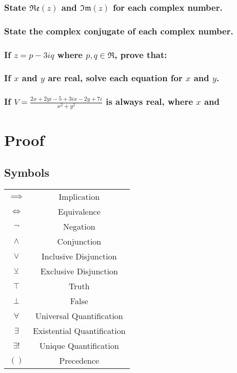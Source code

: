 \documentclass{report}
\newcommand{\re}[1]{\mathfrak{Re}(#1)}
\newcommand{\im}[1]{\mathfrak{Im}(#1)}
\newcommand{\uexists}{\exists !}
\newcommand{\realnumbers}{\mathfrak{R}}
\newcommand{\veebar}{\underbar{$\vee$}}
\begin{document}
            \subsection{State $\re{z}$ and $\im{z}$ for each complex number.}
            \subsection{State the complex conjugate of each complex number.}
            \subsection{If $z=p-3iq$ where $p,q\in\realnumbers$, prove that:}
            \subsection{If $x$ and $y$ are real, solve each equation for $x$ and $y$.}
            \subsection{If $V=\frac{2x+2yi-5+3ix-2y+7i}{x^2+y^2}$ is always real, where $x$ and }
    \chapter{Proof}
        \section{Symbols}
            \begin{tabular}{c|c}
                $\implies$&Implication\\
                $\iff$&Equivalence\\
                $\neg$&Negation\\
                $\wedge$&Conjunction\\
                $\vee$&Inclusive Disjunction\\
                $\veebar$&Exclusive Disjunction\\
                $\top$&Truth\\
                $\bot$&False\\
                $\forall$&Universal Quantification\\
                $\exists$&Existential Quantification\\
                $\uexists$&Unique Quantification\\
                $()$&Precedence\\
            \end{tabular}
\end{document}
